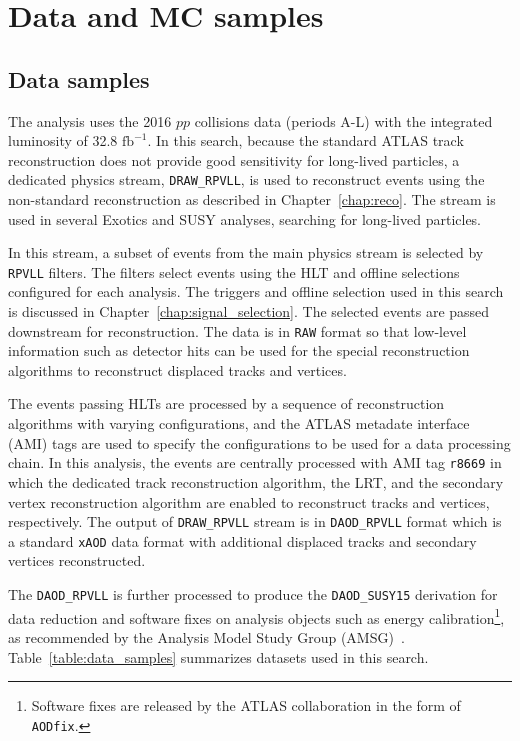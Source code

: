 \chapter{Data and MC samples}
\label{chap:data_mc}

\section{Data samples}
\label{sec:data_mc:data}

The analysis uses the 2016 $pp$ collisions data (periods A-L) with the integrated luminosity of 32.8 $\mathrm{fb^{-1}}$. In this search, because the standard ATLAS track reconstruction does not provide good sensitivity for long-lived particles, a dedicated physics stream, \texttt{DRAW\_RPVLL}, is used to reconstruct events using the non-standard reconstruction as described in Chapter~\ref{chap:reco}. The stream is used in several Exotics and SUSY analyses, searching for long-lived particles. %

In this stream, a subset of events from the main physics stream is selected by \texttt{RPVLL} filters. The filters select events using the HLT and offline selections configured for each analysis. The triggers and offline selection used in this search is discussed in Chapter~\ref{chap:signal_selection}. The selected events are passed downstream for reconstruction. The data is in \texttt{RAW} format so that low-level information such as detector hits can be used for the special reconstruction algorithms to reconstruct displaced tracks and vertices.

The events passing HLTs are processed by a sequence of reconstruction algorithms with varying configurations, and the ATLAS metadate interface (AMI) tags are used to specify the configurations to be used for a data processing chain. In this analysis, the events are centrally processed with AMI tag \texttt{r8669} in which the dedicated track reconstruction algorithm, the LRT, and the secondary vertex reconstruction algorithm are enabled to reconstruct tracks and vertices, respectively. The output of \texttt{DRAW\_RPVLL} stream is in \texttt{DAOD\_RPVLL} format which is a standard \texttt{xAOD} data format with additional displaced tracks and secondary vertices reconstructed. 

The \texttt{DAOD\_RPVLL} is further processed to produce the \texttt{DAOD\_SUSY15} derivation for data reduction and software fixes on analysis objects such as energy calibration\footnote{Software fixes are released by the ATLAS collaboration in the form of \texttt{AODfix}.}, as recommended by the Analysis Model Study Group (AMSG)~\cite{Catmore:1543445}. Table~\ref{table:data_samples} summarizes datasets used in this search.

